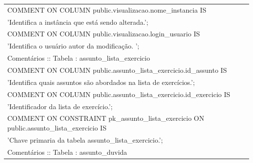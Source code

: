 \documentclass[graduacao,brazil]{ThesisPUC}
\begin{document}
\begin{table}[H]
{\begin{tabular}{|l|}
    COMMENT ON COLUMN public.visualizacao.nome\_instancia IS \\'Identifica a instância que está sendo alterada.'; \\COMMENT ON COLUMN public.visualizacao.login\_usuario IS \\'Identifica o usuário autor da modificação. ';                                                                                                                                                                                                                                                                                                                                                                                                                                           \\ \hline
    Comentários :: Tabela : assunto\_lista\_exercicio                                                                                                                                                                                                                                                                                                                                                                                                                                                                                                                                                                                                                  \\ \hline
    COMMENT ON COLUMN public.assunto\_lista\_exercicio.id\_assunto IS \\'Identifica quais assuntos são abordados na lista de exercícios.'; \\COMMENT ON COLUMN public.assunto\_lista\_exercicio.id\_exercicio IS \\'Identificador da lista de exercício.'; \\COMMENT ON CONSTRAINT pk\_assunto\_lista\_exercicio ON public.assunto\_lista\_exercicio IS \\'Chave primaria da tabela assunto\_lista\_exercicio.';                                                                                                                                                                                                                                                       \\ \hline
    Comentários :: Tabela : assunto\_duvida                                                                                                                                                                                                                                                                                                                                                                                                                                                                                                                                                                                                                            \\ \hline

\end{tabular}}
\end{table}
\end{document}
